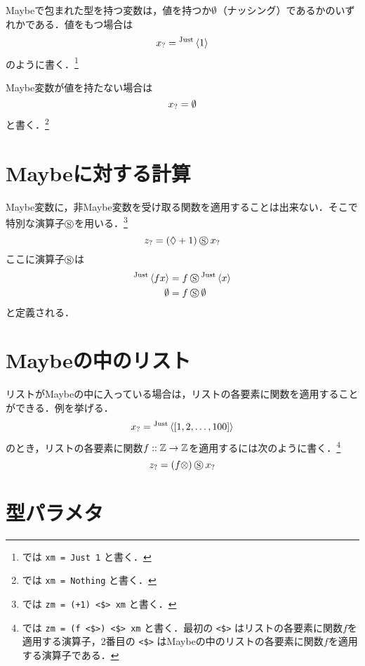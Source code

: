 \documentclass[platex,a5paper,twoside,fleqn,draft]{jsbook}
\begin{document}
Maybeで包まれた型を持つ変数は，値を持つか$\emptyset$（ナッシング）であるかのいずれかである．値をもつ場合は
\begin{equation}
{x}_?={}^{\text{Just}}\left\langle1\right\rangle
\end{equation}
のように書く．\footnote{\haskell では \verb|xm = Just 1| と書く．}

Maybe変数が値を持たない場合は
\begin{equation}
{x}_?=\emptyset
\end{equation}
と書く．\footnote{\haskell では \verb|xm = Nothing| と書く．}

\section{Maybeに対する計算}

Maybe変数に，非Maybe変数を受け取る関数を適用することは出来ない．そこで特別な演算子$\mathbin{\circledS}$を用いる．\footnote{\haskell では \verb|zm = (+1) <$> xm| と書く．}
\begin{equation}
{z}_?=(\mathord{\lozenge}+1)\mathbin{\circledS}{x}_?
\end{equation}
ここに演算子$\mathbin{\circledS}$は
\begin{align}
{}^{\text{Just}}\left\langle fx\right\rangle&=f\mathbin{\circledS}{}^{\text{Just}}\left\langle x\right\rangle\\
\emptyset&=f\mathbin{\circledS}\emptyset
\end{align}
と定義される．

\section{Maybeの中のリスト}

リストがMaybeの中に入っている場合は，リストの各要素に関数を適用することができる．例を挙げる．
\begin{equation}
{x}_?={}^{\text{Just}}\left\langle[1,2,\dots,100]\right\rangle
\end{equation}
のとき，リストの各要素に関数$f::\mathord{\mathbb{Z}}\rightarrow\mathord{\mathbb{Z}}$を適用するには次のように書く．\footnote{\haskell では \verb|zm = (f <$>) <$> xm| と書く．最初の \verb|<$>| はリストの各要素に関数$f$を適用する演算子，2番目の \verb|<$>| はMaybeの中のリストの各要素に関数$f$を適用する演算子である．}
\begin{equation}
{z}_?=(f\otimes)\mathbin{\circledS}{x}_?
\end{equation}

\section{型パラメタ}
\end{document}
